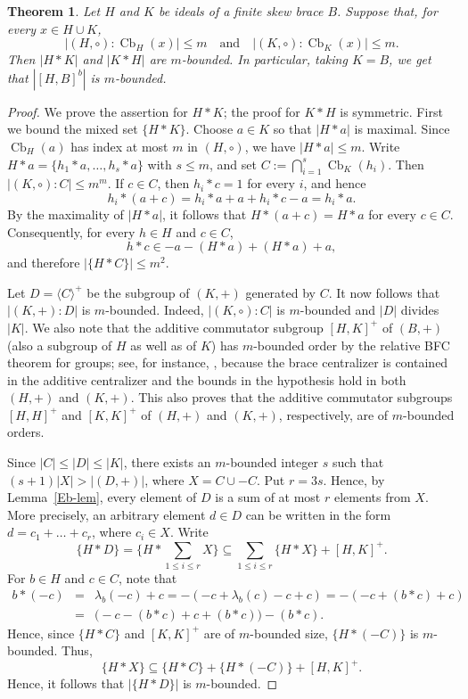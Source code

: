 \documentclass[10pt,a4paper]{amsart}
\numberwithin{equation}{section}
\newtheorem{thm}[equation]{Theorem}
\newcommand{\Cb}{\operatorname{Cb} }
\begin{document}
\begin{thm}\label{lem:relative-BFC}
Let $H$ and $K$ be ideals of a finite skew brace $B$. Suppose that, for every $x\in H\cup K$,
\[
|(H,\circ):\Cb_H(x)| \leqslant m \quad\text{and} \quad |(K,\circ):\Cb_K(x)| \leqslant m.
\]
Then $|H*K|$ and $|K*H|$ are $m$-bounded. In particular, taking $K = B$, we get that $|[H, B]^b|$ is $m$-bounded.
\end{thm}
\begin{proof}
We prove the assertion for $H*K$; the proof for $K*H$ is symmetric. First we bound the mixed set $\{H*K\}$. Choose $a\in K$ so that $|H*a|$ is maximal. Since $\Cb_H(a)$ has index at most $m$ in $(H,\circ)$, we have $|H*a|\leqslant m$. Write $H*a=\{h_1*a,\dots,h_s*a\}$ with $s\leqslant m$, and set  $C :=\bigcap_{i=1}^{s}\Cb_K(h_i)$. Then $|(K,\circ):C|\leqslant m^m$. If $c\in C$, then $h_i*c=1$ for every $i$, and hence
\[
h_i*(a+c)=h_i*a+a+h_i*c-a=h_i*a.
\]
By the maximality of $|H*a|$, it follows that $H*(a+c)=H*a$ for every $c\in C$. Consequently, for every $h\in H$ and $c\in C$,
\[
h*c\in -a-(H*a)+(H*a)+a,
\]
and therefore $|\{H*C\}|\leqslant m^2$.

Let $D =\langle C\rangle^+$ be the subgroup of $(K,+)$ generated by $C$. It now follows that $|(K,+):D|$ is $m$-bounded. Indeed, $|(K, \circ):C|$ is $m$-bounded and $|D|$ divides $|K|$.
 We also note that the additive commutator subgroup $[H, K]^+$ of $(B, +)$ (also a subgroup of $H$ as well as of $K$) has $m$-bounded order by the relative BFC theorem for groups; see, for instance, \cite{DS22}, because the brace centralizer is contained in the additive centralizer and the bounds in the hypothesis hold in both $(H,+)$ and $(K,+)$. This also proves that the additive  commutator subgroups $[H, H]^+$ and $[K, K]^+$ of $(H, +)$ and $(K, +)$, respectively, are of $m$-bounded orders.

Since $|C| \leqslant |D| \leqslant |K|$, there exists an $m$-bounded integer $s$ such that $(s+1)|X|>|(D,+)|$, where $X=C\cup-C$. Put $r=3s$. Hence, by Lemma~\ref{Eb-lem}, every element of $D$ is a sum of at most $r$ elements from $X$. More precisely, an arbitrary element  $d\in D$ can be written in the form $d=c_1+\dots+c_r$, where $c_i \in X$. Write 
$$\{H*D\} = \{H*\sum_{1\leqslant i\leqslant r} X \} \subseteq\sum_{1\leqslant i\leqslant r}\{H * X\}+ [H, K]^+.$$ 
 For $b \in H$ and $c \in C$, note that 
 \begin{eqnarray*} 
 b*(-c) &=& \lambda_b(-c) + c = -(-c + \lambda_b(c) -c +c) = -(-c + (b*c) + c)\\
 &=& \big(-c - (b*c) + c + (b*c)\big) - (b*c).
 \end{eqnarray*}
 Hence, since $\{H*C\}$ and $[K, K]^+$ are of $m$-bounded size, $\{H*(-C)\}$ is $m$-bounded. Thus,
 $$\{H*X\} \subseteq \{H*C\} + \{H*(-C)\} + [H, K]^+.$$
 Hence, it follows that  $|\{H*D\}|$ is $m$-bounded.


\end{proof}
\end{document}
